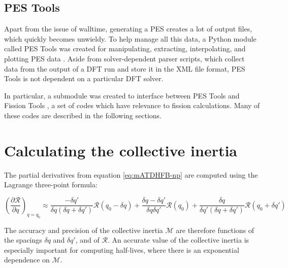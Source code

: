 
\subsection{PES Tools}
Apart from the issue of walltime, generating a PES creates a lot of output files, which quickly becomes unwieldy. To help manage all this data, a Python module called PES Tools was created for manipulating, extracting, interpolating, and plotting PES data \cite{PES_tools}. Aside from solver-dependent parser scripts, which collect data from the output of a DFT run and store it in the XML file format, PES Tools is not dependent on a particular DFT solver.

In particular, a submodule was created to interface between PES Tools and Fission Tools \cite{fission_tools}, a set of codes which have relevance to fission calculations. Many of these codes are described in the following sections.

\section{Calculating the collective inertia}\label{sect:M_numerical}
The partial derivatives from equation \eqref{eq:mATDHFB-np} are computed using the Lagrange three-point formula:

\begin{equation}\label{eq:finite-diffs}
\left(\frac{\partial \mathcal{R}}{\partial q}\right)_{q=q_0} \approx 
    \frac{-\delta q'}{\delta q \left(\delta q + \delta q'\right)}\mathcal{R}(q_0-\delta q) + 
    \frac{\delta q - \delta q'}{\delta q \delta q'}\mathcal{R}(q_0) + 
    \frac{\delta q}{\delta q' \left(\delta q + \delta q'\right)}\mathcal{R}(q_0+\delta q')
\end{equation}

The accuracy and precision of the collective inertia $\mathcal{M}$ are therefore functions of the spacings $\delta q$ and $\delta q'$, and of $\mathcal{R}$. An accurate value of the collective inertia is especially important for computing half-lives, where there is an exponential dependence on $\mathcal{M}$.

